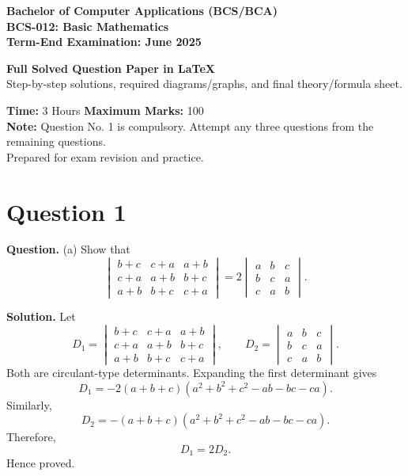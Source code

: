 \documentclass[11pt,a4paper]{article}
\newcommand{\question}[1]{\begin{questionbox}\textbf{Question.} #1\end{questionbox}}
\newcommand{\answer}{\begin{answerbox}\textbf{Solution.} }
\newcommand{\eanswer}{\end{answerbox}}
\begin{document}
\begin{titlepage}
\centering
\vspace*{1.5cm}
{\Large \textbf{Bachelor of Computer Applications (BCS/BCA)}}\\[0.4cm]
{\Huge \textbf{BCS-012: Basic Mathematics}}\\[0.4cm]
{\LARGE \textbf{Term-End Examination: June 2025}}\\[1cm]
\begin{tcolorbox}[colback=lightgray,colframe=titleblue,width=0.88\textwidth,arc=2mm]
\centering
\textbf{Full Solved Question Paper in LaTeX}\\
Step-by-step solutions, required diagrams/graphs, and final theory/formula sheet.
\end{tcolorbox}
\vfill
\textbf{Time:} 3 Hours \qquad \textbf{Maximum Marks:} 100\\[0.4cm]
\textbf{Note:} Question No. 1 is compulsory. Attempt any three questions from the remaining questions.\\[1cm]
\vfill
{Prepared for exam revision and practice.}
\end{titlepage}

\tableofcontents
\newpage

\section*{Question 1}

\question{(a) Show that
\[
\begin{vmatrix}
b+c&c+a&a+b\\
c+a&a+b&b+c\\
a+b&b+c&c+a
\end{vmatrix}
=2\begin{vmatrix}
a&b&c\\ b&c&a\\ c&a&b
\end{vmatrix}.
\]}
\answer
Let
\[
D_1=\begin{vmatrix}
b+c&c+a&a+b\\
c+a&a+b&b+c\\
a+b&b+c&c+a
\end{vmatrix},\qquad
D_2=\begin{vmatrix}
a&b&c\\ b&c&a\\ c&a&b
\end{vmatrix}.
\]
Both are circulant-type determinants. Expanding the first determinant gives
\[
D_1=-2(a+b+c)(a^2+b^2+c^2-ab-bc-ca).
\]
Similarly,
\[
D_2=-(a+b+c)(a^2+b^2+c^2-ab-bc-ca).
\]
Therefore,
\[
D_1=2D_2.
\]
Hence proved.
\eanswer
\end{document}
